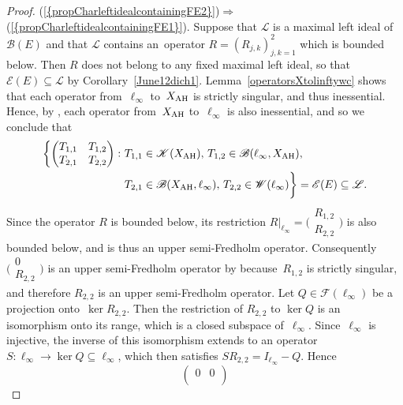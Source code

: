 \documentclass[12pt]{amsart}
\theoremstyle{definition}
\numberwithin{equation}{section}
\begin{document}
\begin{proof}
  {{\normalfont\textrm{(\ref{{propCharleftidealcontainingFE2}})}}}$\Rightarrow$  {{\normalfont\textrm{(\ref{{propCharleftidealcontainingFE1}})}}}. Suppose that $\mathscr{L}$
  is a maximal left ideal of~$\mathscr{B}(E)$ and that $\mathscr{L}$
  contains an~opera\-tor $R= (R_{j,k})_{j,k=1}^2$ which is bounded
  below. Then $R$ does not belong to any fixed maximal left ideal, so
  that $\mathscr{E}(E)\subseteq\mathscr{L}$ by
  Corollary~\ref{June12dich1}.  Lemma~\ref{operatorsXtolinftywc} shows
  that each opera\-tor from~$\ell_\infty$
  to~$X_{\text{\normalfont{AH}}}$ is strictly singular, and thus
  inessential. Hence, by \cite[Proposition~1]{gonzalez}, each operator
  from~$X_{\text{\normalfont{AH}}}$ to~$\ell_\infty$ is also
  inessential, and so we conclude that
  \begin{align}\label{eqinessopinL}
    \biggl\{\begin{pmatrix} T_{1,1} & T_{1,2}\\ T_{2,1} &
      T_{2,2}\end{pmatrix}:\
    &T_{1,1}\in\mathscr{K}(X_{\text{\normalfont{AH}}}),\,
    T_{1,2}\in\mathscr{B}(\ell_\infty,X_{\text{\normalfont{AH}}}),\\
    &T_{2,1}\in\mathscr{B}(X_{\text{\normalfont{AH}}},\ell_\infty),\,
    T_{2,2}\in\mathscr{W}(\ell_\infty) \biggr\} =
    \mathscr{E}(E)\subseteq\mathscr{L}.\notag
  \end{align}
  Since the operator $R$ is bounded below, its restriction
  $R|_{\ell_\infty} = \bigl(\begin{smallmatrix}
    R_{1,2}\\ R_{2,2}\end{smallmatrix}\bigr)$ is also bounded below,
  and is thus an upper semi-Fred\-holm operator. Consequently
  $\bigl(\begin{smallmatrix} 0\\ R_{2,2}\end{smallmatrix}\bigr)$ is an
  upper semi-Fredholm operator by \cite[Proposition~2.c.10]{lt1}
  because~$R_{1,2}$ is strictly singular, and therefore $R_{2,2}$ is
  an upper semi-Fredholm operator. Let $Q\in\mathscr{F}(\ell_\infty)$
  be a projection onto~$\ker R_{2,2}$. Then the restriction of
  $R_{2,2}$ to $\ker Q$ is an isomorphism onto its range, which is a
  closed subspace of~$\ell_\infty$. Since~$\ell_\infty$ is injective,
  the inverse of this isomorphism extends to an operator $S\colon
  \ell_\infty\to \ker Q\subseteq\ell_\infty$, which then satisfies
  $SR_{2,2} = I_{\ell_\infty}-Q$. Hence 
  \[ \begin{pmatrix} 0 &   0\\

\end{pmatrix}\]
\end{proof}
\end{document}
